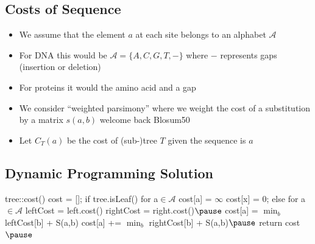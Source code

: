 
\begin{slide}
\section{Costs of Sequence}

\begin{PauseHighLight}
  \begin{itemize}
  \item We assume that the element $a$ at each site belongs to an
    alphabet $\mathcal{A}$\pause
  \item For DNA this would be $\mathcal{A} =\{A, C, G, T, -\}$ where $-$
    represents gaps (insertion or deletion)\pause
  \item For proteins it would the amino acid and a gap\pause
  \item We consider ``weighted parsimony'' where we weight the cost of a
    substitution by a matrix $s(a,b)$\pause{} welcome back
    Blosum50\pauseb
  \item Let $C_T(a)$ be the cost of (sub-)tree $T$ given the sequence is
    $a$\pause 
  \end{itemize}
\end{PauseHighLight}

\end{slide}


\begin{slide}
\section{Dynamic Programming Solution}

\begin{pseudo}
  tree::cost() {
    cost = [];                                     %
    if tree.isLeaf() {                           %
      for a$\in \mathcal{A}$ {
        cost[a] = $\infty$
      }
      cost[x] = 0;                                 %
    } else {
      for a$\in \mathcal{A}$ {
        leftCost = left.cost()                     %
        rightCost = right.cost()$\pause$
        cost[a] = $\min_b$ leftCost[b] + S(a,b)    %
        cost[a] += $\min_b$ rightCost[b] + S(a,b)$\pause$
      }
    }
    return cost                                     %
  }$\pause$
\end{pseudo}


\end{slide}

